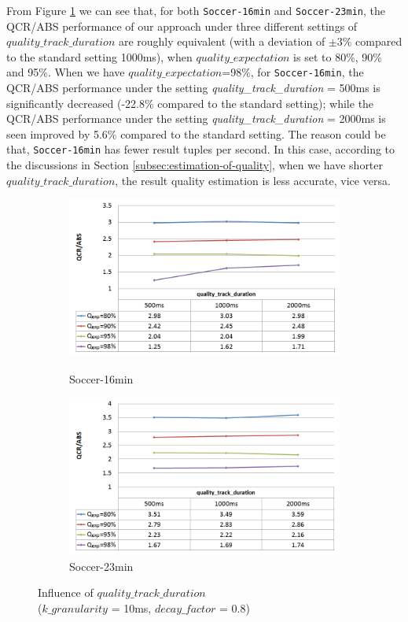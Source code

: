 \documentclass[a4paper, 11pt, twoside]{report}
\begin{document}
From Figure \ref{fig:influence-quality-track-duration} we can see that, for both \texttt{Soccer-16min} and \texttt{Soccer-23min}, the QCR/ABS performance of our approach under three different settings of $quality\_track\_duration$ are roughly equivalent (with a deviation of $\pm 3\%$ compared to the standard setting 1000ms), when $quality\_expectation$ is set to 80\%, 90\% and 95\%. When we have $quality\_expectation$=98\%, for \texttt{Soccer-16min}, the QCR/ABS performance under the setting \emph{quality\_track\_duration} = 500ms is significantly decreased (-22.8\% compared to the standard setting); while the QCR/ABS performance under the setting \emph{quality\_track\_duration} = 2000ms is seen improved by 5.6\% compared to the standard setting. The reason could be that, \texttt{Soccer-16min} has fewer result tuples per second. In this case, according to the discussions in Section \ref{subsec:estimation-of-quality}, when we have shorter $quality\_track\_duration$, the result quality estimation is less accurate, vice versa.\\

\clearpage

\begin{figure}[H]
	\centering
	\begin{subfigure}[t]{5in}
		\centering
		\includegraphics[width=5in]{influence-quality-track-duration-16min}
		\caption{Soccer-16min}
		\hspace{5pt}
		\includegraphics[width=5in]{influence-quality-track-duration-23min}
		\caption{Soccer-23min}	
	\end{subfigure}
	\caption{Influence of $quality\_track\_duration$ \protect\\ ($k\_granularity$ = 10ms, $decay\_factor$ = 0.8)}
	\label{fig:influence-quality-track-duration}
\end{figure}
\end{document}
